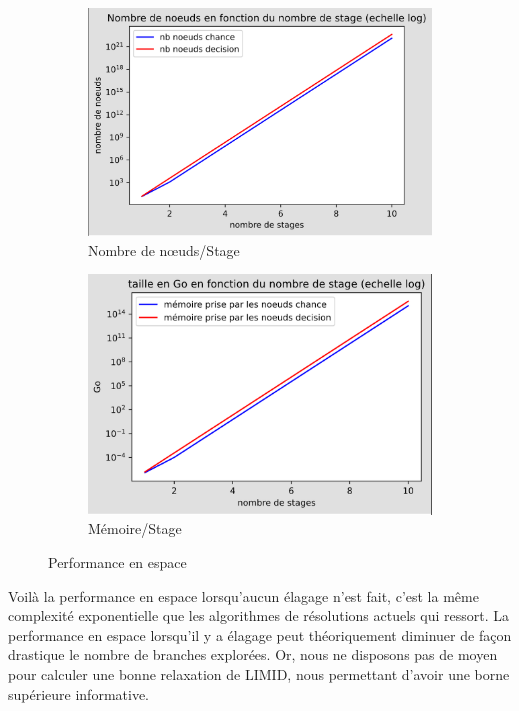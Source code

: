 \documentclass[12pt]{article}
\begin{document}
\begin{figure}[h]
\centering
\begin{subfigure}{.5\textwidth}
  \centering
  \includegraphics[width=.65\linewidth]{docs/ressources_rapport/perf_espace.png}
  \caption{Nombre de nœuds/Stage}
  \label{fig:sub8}
\end{subfigure}%
\begin{subfigure}{.5\textwidth}
  \centering
  \includegraphics[width=.65\linewidth]{docs/ressources_rapport/perf_Go.png}
  \caption{Mémoire/Stage}
  \label{fig:sub9}
\end{subfigure}
\caption{Performance en espace}
\label{fig:test4}
\end{figure}

Voilà la performance en espace lorsqu'aucun élagage n'est fait, c'est la même complexité exponentielle que les algorithmes de résolutions actuels qui ressort. La performance en espace lorsqu'il y a élagage peut théoriquement diminuer de façon drastique le nombre de branches explorées. Or, nous ne disposons pas de moyen pour calculer une bonne relaxation de LIMID, nous permettant d'avoir une borne supérieure informative.
\end{document}
